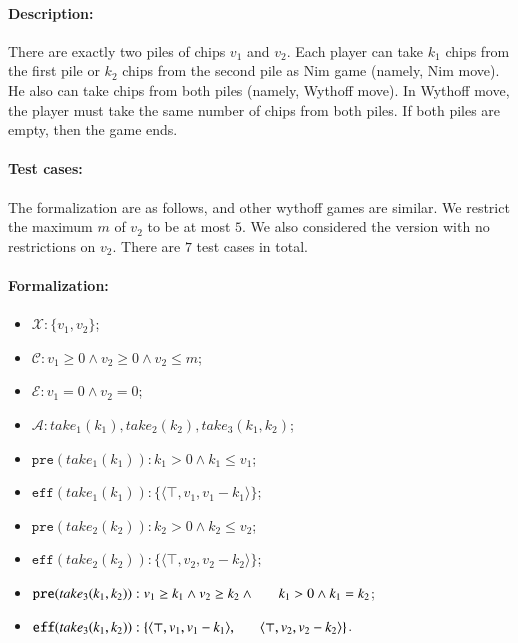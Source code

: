 \documentclass[review]{elsarticle}
\newcommand{\set}[1]{\{ #1 \}}
\newcommand{\tuple}[1]{\langle {#1} \rangle}
\newcommand{\true}{\top}
\newcommand{\statevar}{\mathcal{X}}
\newcommand{\act}{\mathcal{A}}
\newcommand{\constraint}{\mathcal{C}}
\newcommand{\estate}{\mathcal{E}}
\newcommand{\pre}{\mathtt{pre}}
\newcommand{\eff}{\mathtt{eff}}
\begin{document}
\paragraph{Description:}  
There are exactly two piles of chips $v_1$ and $v_2$.
Each player can take $k_1$ chips from the first pile or $k_2$ chips from the second pile as Nim game (namely, Nim move).
He also can take chips from both piles (namely, Wythoff move).
In Wythoff move, the player must take the same number of chips from both piles.
If both piles are empty, then the game ends.	

\paragraph{Test cases:}
The formalization are as follows, and other wythoff games are similar.
We restrict the maximum $m$ of $v_2$ to be at most $5$.
We also considered the version with no restrictions on $v_2$.
There are $7$ test cases in total.


\paragraph{Formalization:}
\begin{itemize}
	\item $\statevar: \set{v_1, v_2}$;
	\item $\constraint: v_1 \ge 0 \wedge  v_2 \ge 0 \wedge v_2 \le m$;
	\item $\estate: v_1 =0 \wedge v_2 = 0$;
	\item $\act:take_1(k_1), take_2(k_2), take_3(k_1,k_2)$;
	\item $\pre(take_1(k_1)) :  k_1 > 0 \wedge k_1 \le v_1$;
	\item $\eff(take_1(k_1)) : \set{\tuple{\true, v_1, v_1-k_1}}$;
	\item $\pre(take_2(k_2)) :  k_2 > 0 \wedge k_2 \le v_2$;
	\item $\eff(take_2(k_2)) : \set{\tuple{\true, v_2, v_2-k_2}}$;
	\item $\pre(take_3(k_1,k_2)) : v_1 \ge k_1 \wedge v_2 \ge k_2 \wedge  \\ \hspace*{6mm}
	k_1 > 0 \wedge k_1 = k _2$;
	\item $\eff(take_3(k_1,k_2)) : \set{\tuple{\true, v_1, v_1 -k_1},\\ \hspace*{6mm}
		\tuple{\true, v_2, v_2 - k_2}}$.
\end{itemize}
\end{document}
